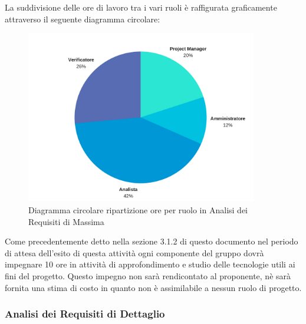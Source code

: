 			
			La suddivisione delle ore di lavoro tra i vari ruoli è raffigurata graficamente attraverso il seguente diagramma circolare:
			\begin{figure}[H] 
			\centering 
				\includegraphics[width=0.9\textwidth]{images/CircolareAnalisiRequisitiDiMassima.png} 
				\caption{Diagramma circolare ripartizione ore per ruolo in Analisi dei Requisiti di Massima}
			\label{CircolareAnalisiRequisitiDiMassima}
			\end{figure}

			
			Come precedentemente detto nella sezione 3.1.2 di questo documento nel periodo di attesa dell'esito di questa attività ogni componente del gruppo dovrà impegnare 10 ore in attività di approfondimento e studio delle tecnologie utili ai fini del progetto. Questo impegno non sarà rendicontato al proponente, nè sarà fornita una stima di costo in quanto non è assimilabile a nessun ruolo di progetto.
		
		\subsubsection{Analisi dei Requisiti di Dettaglio}
